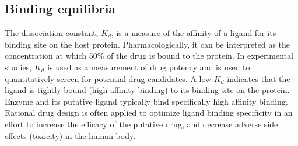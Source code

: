 




\subsection{Binding equilibria}

The dissociation constant, $K_d$, is a measure of the affinity of a ligand for its binding site on the host protein. Pharmacologically, it can be interpreted as the concentration at which 50\% of the drug is bound to the protein. In experimental studies, $K_d$ is used as a measurement of drug potency and is used to quantitatively screen for potential drug candidates.  A low $K_d$ indicates that the ligand is tightly bound (high affinity binding) to its binding site on the protein.  Enzyme and its putative ligand typically bind specifically high affinity binding.  Rational drug design is often applied to optimize ligand binding specificity in an effort to increase the efficacy of the putative drug, and decrease adverse side effects (toxicity) in the human body.

